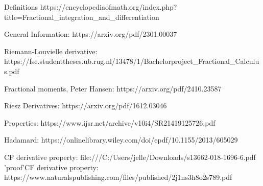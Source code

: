 Definitions https://encyclopediaofmath.org/index.php?title=Fractional_integration_and_differentiation

General Information: https://arxiv.org/pdf/2301.00037

Riemann-Louvielle derivative:
https://fse.studenttheses.ub.rug.nl/13478/1/Bachelorproject_Fractional_Calculus.pdf

Fractional moments, Peter Hansen: https://arxiv.org/pdf/2410.23587


Riesz Derivatives: https://arxiv.org/pdf/1612.03046

Properties: https://www.ijsr.net/archive/v10i4/SR21419125726.pdf

Hadamard: https://onlinelibrary.wiley.com/doi/epdf/10.1155/2013/605029

CF derivative property: file:///C:/Users/jelle/Downloads/s13662-018-1696-6.pdf
'proof'CF derivative property: https://www.naturalspublishing.com/files/published/2j1ns3h8o2s789.pdf